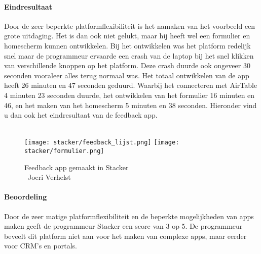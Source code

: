 \paragraph*{Eindresultaat}
Door de zeer beperkte platformflexibiliteit is het namaken van het voorbeeld een grote uitdaging. Het is dan ook niet gelukt, maar hij heeft wel een formulier en homescherm
kunnen ontwikkelen. Bij het ontwikkelen was het platform redelijk snel maar de programmeur ervaarde een crash van de laptop bij het snel klikken van verschillende knoppen op het platform.
Deze crash duurde ook ongeveer 30 seconden vooraleer alles terug normaal was. Het totaal ontwikkelen van de app heeft 26 minuten en 47 seconden geduurd. Waarbij het connecteren met AirTable 4 minuten 23 seconden duurde, het ontwikkelen van het formulier 16 minuten en 46,
en het maken van het homescherm 5 minuten en 38 seconden. Hieronder vind u dan ook het eindresultaat van de feedback app.
\\
\\

\begin{figure}[H]
    \texttt{[image: stacker/feedback\_lijst.png]}
    \texttt{[image: stacker/formulier.png]}
    \caption[Feedback app gemaakt in Stacker]{Feedback app gemaakt in Stacker\\\textcopyright\ Joeri Verhelst}
    \label{fig:feedback-app-stacker}
\end{figure}

\paragraph*{Beoordeling}
Door de zeer matige platformflexibiliteit en de beperkte mogelijkheden van apps maken geeft de programmeur Stacker een score van 3 op 5.
De programmeur beveelt dit platform niet aan voor het maken van complexe apps, maar eerder voor CRM's en portals.

